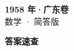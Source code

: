 \documentclass[zihao=-4, a4paper]{ctexart}
\begin{document}
\begin{center}
  {\Large\bfseries 1958 年·广东卷}\\[4pt]
  {\large 数学 · 简答版}
\end{center}
\medskip
{}

\clearpage
{}
\begin{center}{\Large\bfseries 答案速查}\end{center}
\medskip

\end{document}
